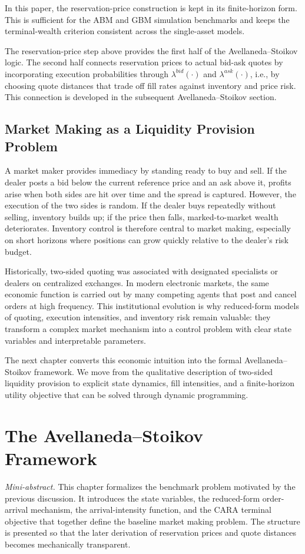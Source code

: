 \documentclass[a4paper,10pt,titlepage,oneside,openany]{book}
\theoremstyle{plain}\newtheorem{theorem}{Theorem}[chapter]
\theoremstyle{definition}\newtheorem{definition}{Definition}[chapter]
\theoremstyle{remark}\newtheorem{remark}{Remark}[chapter]
\newcommand{\miniabstract}[1]{%
\vspace{-2pt}
\begin{tcolorbox}[colback=gray!6,colframe=black!15,boxrule=0.3pt,arc=3pt,left=6pt,right=6pt,top=4pt,bottom=4pt]
\textit{Mini-abstract.} #1
\end{tcolorbox}
\vspace{-4pt}
}
\begin{document}
In this paper, the reservation-price construction is kept in its finite-horizon form. This is sufficient for the ABM and GBM simulation benchmarks and keeps the terminal-wealth criterion consistent across the single-asset models.

The reservation-price step above provides the first half of the Avellaneda--Stoikov logic. The second half connects reservation prices to actual bid-ask quotes by incorporating execution probabilities through $\lambda^{bid}(\cdot)$ and $\lambda^{ask}(\cdot)$, i.e., by choosing quote distances that trade off fill rates against inventory and price risk. This connection is developed in the subsequent Avellaneda--Stoikov section.

\section{Market Making as a Liquidity Provision Problem}
A market maker provides immediacy by standing ready to buy and sell. If the dealer posts a bid below the current reference price and an ask above it, profits arise when both sides are hit over time and the spread is captured. However, the execution of the two sides is random. If the dealer buys repeatedly without selling, inventory builds up; if the price then falls, marked-to-market wealth deteriorates. Inventory control is therefore central to market making, especially on short horizons where positions can grow quickly relative to the dealer's risk budget.

Historically, two-sided quoting was associated with designated specialists or dealers on centralized exchanges. In modern electronic markets, the same economic function is carried out by many competing agents that post and cancel orders at high frequency. This institutional evolution is why reduced-form models of quoting, execution intensities, and inventory risk remain valuable: they transform a complex market mechanism into a control problem with clear state variables and interpretable parameters.

The next chapter converts this economic intuition into the formal Avellaneda--Stoikov framework. We move from the qualitative description of two-sided liquidity provision to explicit state dynamics, fill intensities, and a finite-horizon utility objective that can be solved through dynamic programming.

\chapter{The Avellaneda--Stoikov Framework}
\miniabstract{This chapter formalizes the benchmark problem motivated by the previous discussion. It introduces the state variables, the reduced-form order-arrival mechanism, the arrival-intensity function, and the CARA terminal objective that together define the baseline market making problem. The structure is presented so that the later derivation of reservation prices and quote distances becomes mechanically transparent.}
\end{document}
